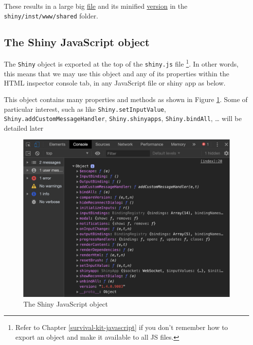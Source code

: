 \documentclass[]{book}
\newenvironment{Shaded}{\begin{snugshade}}{\end{snugshade}}
\newcommand{\ControlFlowTok}[1]{\textcolor[rgb]{0.13,0.29,0.53}{\textbf{#1}}}
\newcommand{\KeywordTok}[1]{\textcolor[rgb]{0.13,0.29,0.53}{\textbf{#1}}}
\newcommand{\NormalTok}[1]{#1}
\newcommand{\OperatorTok}[1]{\textcolor[rgb]{0.81,0.36,0.00}{\textbf{#1}}}
\newcommand{\StringTok}[1]{\textcolor[rgb]{0.31,0.60,0.02}{#1}}
\begin{document}
These results in a large big \href{https://github.com/rstudio/shiny/blob/master/inst/www/shared/shiny.js}{file} and its minified \href{https://github.com/rstudio/shiny/blob/master/inst/www/shared/shiny.min.js}{version} in the \texttt{shiny/inst/www/shared} folder.

\hypertarget{the-shiny-javascript-object}{%
\subsection{The Shiny JavaScript object}\label{the-shiny-javascript-object}}

The \texttt{Shiny} object is exported at the top of the \texttt{shiny.js} file \footnote{Refer to Chapter \ref{survival-kit-javascript} if you don't remember how to export an object and make it available to all JS files.}. In other words, this means that we may use this object and any of its properties within the HTML inspector console tab, in any JavaScript file or shiny app as below.

\begin{Shaded}
\end{Shaded}

This object contains many properties and methods as shown in Figure \ref{fig:shiny-object}. Some of particular interest, such as like \texttt{Shiny.setInputValue}, \texttt{Shiny.addCustomMessageHandler}, \texttt{Shiny.shinyapps}, \texttt{Shiny.bindAll}, \ldots{} will be detailed later

\begin{figure}
\includegraphics[width=17.44in]{images/survival-kit/shiny-object} \caption{The Shiny JavaScript object}\label{fig:shiny-object}
\end{figure}
\end{document}
